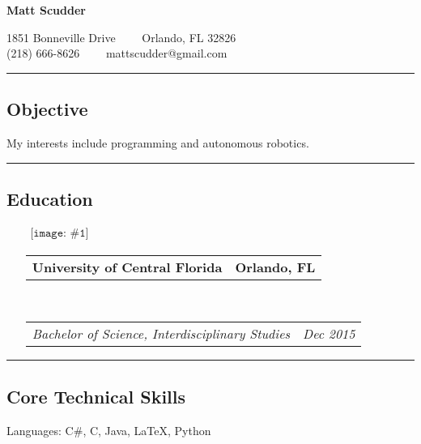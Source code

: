 \documentclass[11pt,letterpaper]{article}
\makeatletter
\newenvironment{indentsection}[1]%
{\begin{list}{}%
	{\setlength{\leftmargin}{#1}}%
	\item[]%
}
{\end{list}}
\newcommand{\headerrow}[2]
{\begin{tabular*}{\linewidth}{l@{\extracolsep{\fill}}r}
	#1 &
	#2 \\
\end{tabular*}}
\newcommand{\centeredicon}[1]
	{$\begin{array}{r}
	\texttt{[image: \#1]}
	\end{array}$}
\makeatother
\begin{document}
\begin{center}
{\Huge \textbf{Matt Scudder}}

1851 Bonneville Drive\ \ \textbullet
\ \ Orlando, FL 32826
\\
(218) 666-8626\ \ \textbullet
\ \ mattscudder@gmail.com
\end{center}

\hrule
\subsection*{Objective}
My interests include programming and autonomous robotics. \\

\hrule
\vspace{-0.4em}
\subsection*{Education}

\begin{itemize}
	\parskip=0.1em

	\item[\centeredicon{diploma.png}]
	\headerrow
		{\textbf{University of Central Florida}}
		{\textbf{Orlando, FL}}
	\\
	\headerrow
		{\emph{Bachelor of Science, Interdisciplinary Studies}}
		{\emph{Dec 2015}}




\end{itemize}






\hrule
\vspace{-0.4em}
\subsection*{Core Technical Skills}

\begin{indentsection}{\parindent}
\begin{description*}
	\item[Languages:]
	C\#, C, Java, \LaTeX, Python
\end{description*}
\end{indentsection}
\end{document}
